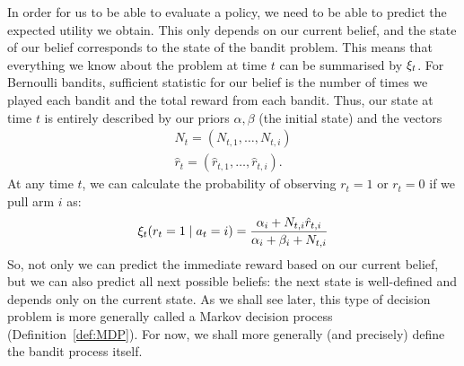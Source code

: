 In order for us to be able to evaluate a policy, we need to be able to
predict the expected utility we obtain. This only depends on our
current belief, and the state of our belief corresponds to the state
of the bandit problem. This means that
everything we know about the problem at time $t$ can be summarised by
$\xi_t$. For Bernoulli bandits, sufficient statistic for our belief
is the number of times we played each bandit and the total reward from
each bandit.  Thus, our state at time $t$ is entirely described by our
priors $\alpha, \beta$ (the initial state) and the vectors
\begin{align}
  N_t = (N_{t,1}, \ldots, N_{t,i})\\
  \hat{r}_t = (\hat{r}_{t,1}, \ldots, \hat{r}_{t,i}).
\end{align}
At any time $t$, we can calculate the probability of observing
$r_t = 1$ or $r_t = 0$ if we pull arm $i$ as:
\[
\xi_t(r_t = 1 \mid a_t = i) = \frac{\alpha_i + N_{t,i} \hat{r}_{t,i}}{\alpha_i + \beta_i + N_{t,i}}
\]
So, not only we can predict the immediate reward based on our current
belief, but we can also predict all next possible beliefs: the next
state is well-defined and depends only on the current state.  As we
shall see later, this type of decision problem is more generally called a Markov
decision process (Definition~\ref{def:MDP}). For now, we shall more generally (and precisely) define the bandit process itself.

